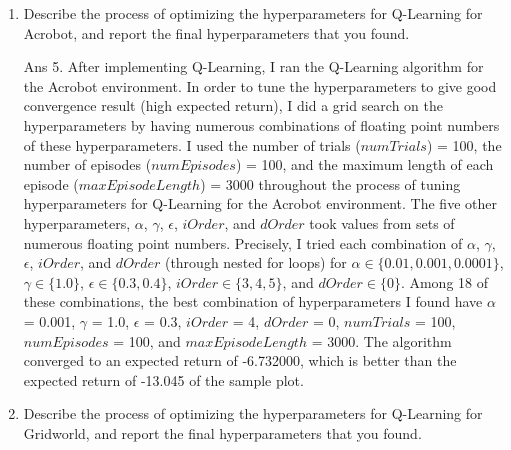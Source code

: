 \documentclass[]{article}
\begin{document}
\begin{enumerate}
{	}

    \item Describe the process of optimizing the hyperparameters for Q-Learning for Acrobot, and report the final hyperparameters that you found.

	{
		\color{blue}
		Ans 5. After implementing Q-Learning, I ran the Q-Learning algorithm for the Acrobot environment. In order to tune the hyperparameters to give good convergence result (high expected return), I did a grid search on the hyperparameters by having numerous combinations of floating point numbers of these hyperparameters. I used the number of trials ($numTrials$) = 100, the number of episodes ($numEpisodes$) = 100, and the maximum length of each episode ($maxEpisodeLength$) = 3000 throughout the process of tuning hyperparameters for Q-Learning for the Acrobot environment. The five other hyperparameters, $\alpha$, $\gamma$, $\epsilon$, $iOrder$, and $dOrder$ took values from sets of numerous floating point numbers. Precisely, I tried each combination of $\alpha$, $\gamma$, $\epsilon$, $iOrder$, and $dOrder$ (through nested for loops) for $\alpha \in \{0.01, 0.001, 0.0001\}$, $\gamma \in \{1.0\}$, $\epsilon \in \{0.3, 0.4\}$, $iOrder \in \{3, 4, 5\}$, and $dOrder \in \{0\}$. Among 18 of these combinations, the best combination of hyperparameters I found have $\alpha$ = 0.001, $\gamma$ = 1.0, $\epsilon$ = 0.3, $iOrder$ = 4, $dOrder$ =  0, $numTrials$ = 100, $numEpisodes$ = 100, and $maxEpisodeLength$ = 3000. The algorithm converged to an expected return of -6.732000, which is better than the expected return of -13.045 of the sample plot.

	}

    \item Describe the process of optimizing the hyperparameters for Q-Learning for Gridworld, and report the final hyperparameters that you found.


\end{enumerate}
\end{document}
